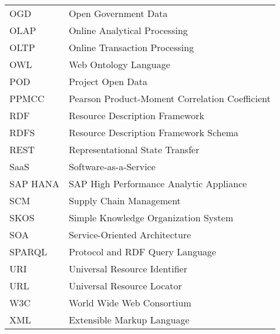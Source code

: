 \begin{longtable}{lp{9cm}}
 OGD & Open Government Data\\
 OLAP & Online Analytical Processing \\
 OLTP & Online Transaction Processing \\
 OWL &  Web Ontology Language \\
 POD & Project Open Data \\
 PPMCC & Pearson Product-Moment Correlation Coefficient \\
 RDF  & Resource Description Framework\\
 RDFS & Resource Description Framework Schema \\
 REST & Representational State Transfer\\
 SaaS & Software-as-a-Service \\
 SAP HANA & SAP High Performance Analytic Appliance \\
 SCM & Supply Chain Management\\
 SKOS &  Simple Knowledge Organization System \\
 SOA & Service-Oriented Architecture\\
 SPARQL & Protocol and RDF Query Language \\
 URI & Universal Resource Identifier \\
 URL & Universal Resource Locator \\
 W3C & World Wide Web Consortium \\
 XML & Extensible Markup Language
\end{longtable}

